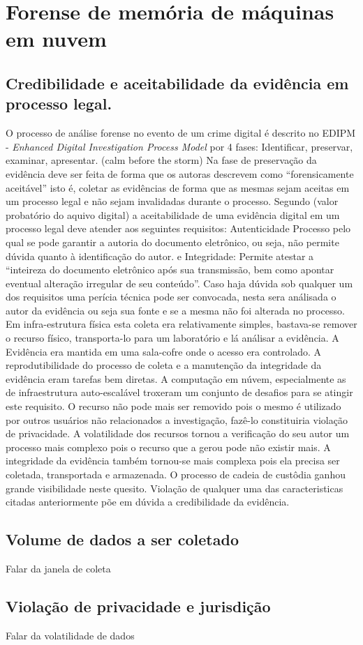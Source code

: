 \chapter{Forense de memória de máquinas em nuvem}

\section{Credibilidade e aceitabilidade da evidência em processo legal.}

O processo de análise forense no evento de um crime digital é descrito no EDIPM - \textit{Enhanced Digital Investigation Process Model} por 4 fases: Identificar, preservar, examinar, apresentar. (calm before the storm)
%
Na fase de preservação da evidência deve ser feita de forma que os autoras descrevem como ``forensicamente aceitável'' isto é, coletar as evidências de forma que as mesmas sejam aceitas em um processo legal e não sejam invalidadas durante o processo.
%
Segundo (valor probatório do aquivo digital) a aceitabilidade de uma evidência digital em um processo legal deve atender aos seguintes requisitos: Autenticidade Processo pelo qual se pode garantir a autoria do documento eletrônico, ou seja, não permite dúvida quanto à identificação do autor.
%
e Integridade: Permite atestar a “inteireza do documento eletrônico após sua transmissão, bem como apontar eventual alteração irregular de seu conteúdo”.
%
Caso haja dúvida sob qualquer um dos requisitos uma perícia técnica pode ser convocada, nesta sera análisada o autor da evidência ou seja sua fonte e se a mesma não foi alterada no processo.
%
Em infra-estrutura física esta coleta era relativamente simples, bastava-se remover o recurso físico, transporta-lo para um laboratório e lá análisar a evidência. A Evidência era mantida em uma sala-cofre onde o acesso era controlado.
%
A reprodutibilidade do processo de coleta e a manutenção da integridade da evidência eram tarefas bem diretas.
%
A computação em núvem, especialmente as de infraestrutura auto-escalável troxeram um conjunto de desafios para se atingir este requisito. O recurso não pode mais ser removido pois o mesmo é utilizado por outros usuários não relacionados a investigação, fazê-lo constituiria violação de privacidade.
%
A volatilidade dos recursos tornou a verificação do seu autor um processo mais complexo pois o recurso que a gerou pode não existir mais.
%
A integridade da evidência também tornou-se mais complexa pois ela precisa ser coletada, transportada e armazenada. O processo de cadeia de custôdia ganhou grande visibilidade neste quesito.
%
Violação de qualquer uma das caracteristicas citadas anteriormente põe em dúvida a credibilidade da evidência.

\section{Volume de dados a ser coletado}

Falar da janela de coleta

\section{Violação de privacidade e jurisdição}

Falar da volatilidade de dados

